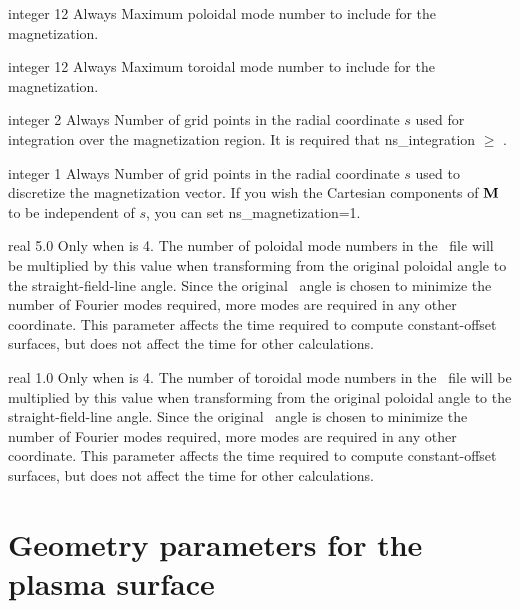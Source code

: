 {integer}
{12}
{Always}
{Maximum poloidal mode number to include for the magnetization.
}

\myhrule

{integer}
{12}
{Always}
{
Maximum toroidal mode number to include for the magnetization.
}

\myhrule

{integer}
{2}
{Always}
{
Number of grid points in the radial coordinate $s$ used for integration over the magnetization region.
It is required that {\ttfamily ns\_integration} $\ge$ .
}

\myhrule

{integer}
{1}
{Always}
{
Number of grid points in the radial coordinate $s$ used to discretize the magnetization vector. If you wish the Cartesian components of ${\mathbf M}$ to be
independent of $s$, you can set {\ttfamily ns\_magnetization=1}.
}

\myhrule

{real}
{5.0}
{Only when  is 4.}
{The number of poloidal mode numbers in the \vmec~file will be multiplied by this value
when transforming from the original poloidal angle to the straight-field-line angle.
Since the original \vmec~angle is chosen to minimize the number of Fourier modes required,
more modes are required in any other coordinate.
This parameter affects the time required to compute constant-offset surfaces,
but does not affect the time for other calculations.
}

\myhrule

{real}
{1.0}
{Only when  is 4.}
{The number of toroidal mode numbers in the \vmec~file will be multiplied by this value
when transforming from the original poloidal angle to the straight-field-line angle.
Since the original \vmec~angle is chosen to minimize the number of Fourier modes required,
more modes are required in any other coordinate.
This parameter affects the time required to compute constant-offset surfaces,
but does not affect the time for other calculations.
}

\myhrule

\section{Geometry parameters for the plasma surface}

